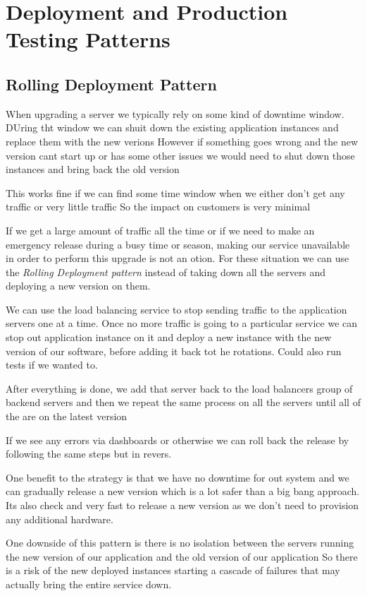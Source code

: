 \documentclass[a4paper, 11pt]{book}
\begin{document}
    \section{Deployment and Production Testing Patterns}

    \subsection{Rolling Deployment Pattern}
    When upgrading a server we typically rely on some kind of downtime window.
    DUring tht window we can shuit down the existing application instances and replace them with the new verions
    However if something goes wrong and the new version cant start up or has some other issues we would need to shut down those instances and bring back the old version

    This works fine if we can find some time window when we either don't get any traffic or very little traffic
    So the impact on customers is very minimal

    If we get a large amount of traffic all the time or if we need to make an emergency release during a busy time or season, making our service unavailable in order to perform this upgrade is not an otion.
    For these situation we can use the \textit{Rolling Deployment pattern} instead of taking down all the servers and deploying a new version on them.

    We can use the load balancing service to stop sending traffic to the application servers one at a time.
    Once no more traffic is going to a particular service we can stop out application instance on it and deploy a new instance with the new version of our software, before adding it back tot he rotations.
    Could also run tests if we wanted to.

    After everything is done, we add that server back to the load balancers group of backend servers and then we repeat the same process on all the servers until all of the are on the latest version

    If we see any errors via dashboards or otherwise we can roll back the release by following the same steps but in revers.

    One benefit to the strategy is that we have no downtime for out system and we can gradually release a new version which is a lot safer than a big bang approach.
    Its also check and very fast to release a new version as we don't need to provision any additional hardware.

    One downside of this pattern is there is no isolation between the servers running the new version of our application and the old version of our application
    So there is a risk of the new deployed instances starting a cascade of failures that may actually bring the entire service down.
\end{document}
